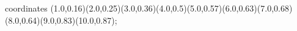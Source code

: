 					coordinates { (1.0,0.16)(2.0,0.25)(3.0,0.36)(4.0,0.5)(5.0,0.57)(6.0,0.63)(7.0,0.68)(8.0,0.64)(9.0,0.83)(10.0,0.87)};